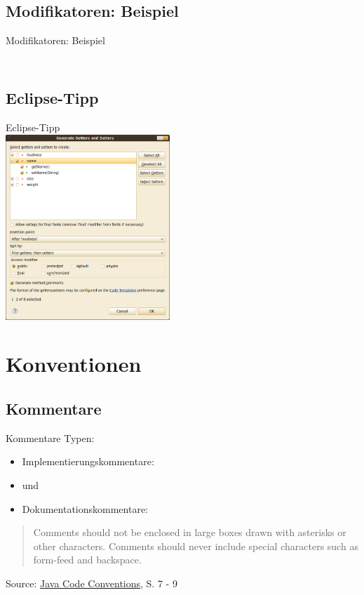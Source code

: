 \documentclass[usepdftitle=false,hyperref={pdfpagelabels=false}]{beamer}
\begin{document}
\subsection{Modifikatoren: Beispiel}
\begin{frame}{Modifikatoren: Beispiel}
  \inputminted[linenos=true, numbersep=5pt, tabsize=4, fontsize=\tiny, frame=lines, label=Student.java, firstline=21, lastline=30]{java}{Visibility.java}
  \inputminted[linenos=true, numbersep=5pt, tabsize=4, fontsize=\tiny, frame=lines, label=Student.java, firstline=32, lastline=39]{java}{Visibility.java}
\end{frame}

\subsection{Eclipse-Tipp}
\begin{frame}{Eclipse-Tipp}
    \\
    \includegraphics[width=62mm]{eclipse-getter-setter.png}
\end{frame}

\section{Konventionen}
\subsection{Kommentare}
\begin{frame}{Kommentare}
    Typen:
    \begin{itemize}
        \item Implementierungskommentare: \item {} und 
        \item Dokumentationskommentare: 
    \end{itemize}

    \begin{quote}
        Comments should not be enclosed in large boxes drawn with asterisks or other characters.
        Comments should never include special characters such as form-feed and backspace.
    \end{quote}
    Source: \href{http://www.oracle.com/technetwork/java/codeconventions-150003.pdf}{Java Code Conventions}, S. 7 - 9
\end{frame}
\end{document}
